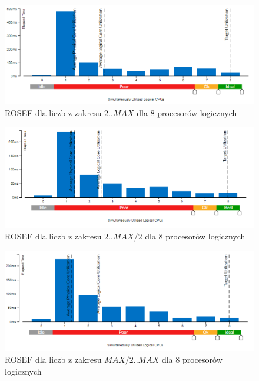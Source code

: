 \documentclass{article}
\begin{document}
                \begin{figure}[H]
                    \includegraphics[width=13cm]{rownolegly_funcion_opt8_2_MAX}
                    \caption{\gls{ROSEF} dla liczb z zakresu $2 .. MAX$ dla 8 procesorów logicznych}
                \end{figure}
                \begin{figure}[H]
                    \includegraphics[width=13cm]{rownolegly_funcion_opt8_2_MAX2}
                    \caption{\gls{ROSEF} dla liczb z zakresu $2 .. MAX / 2$ dla 8 procesorów logicznych}
                \end{figure}
                \begin{figure}[H]
                    \includegraphics[width=13cm]{rownolegly_funcion_opt8_MAX2_MAX}
                    \caption{\gls{ROSEF} dla liczb z zakresu $MAX / 2 .. MAX$ dla 8 procesorów logicznych}
                \end{figure}
                
\end{document}

